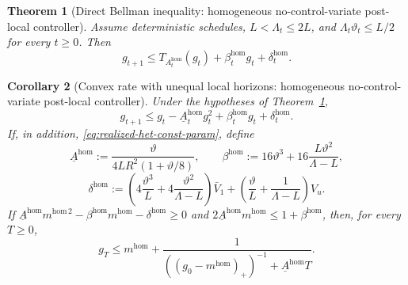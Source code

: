 \documentclass{article}
\newtheorem{theorem}{Theorem}[section]
\newtheorem{corollary}[theorem]{Corollary}
\theoremstyle{definition}
\begin{document}
\begin{theorem}[Direct Bellman inequality: homogeneous no-control-variate post-local controller]
\label{th:realized-hom-bellman}
Assume deterministic schedules, $L<\Lambda_t\le 2L$, and $\Lambda_t\vartheta_t\le L/2$ for every $t\ge 0$. Then
\begin{equation}
g_{t+1}
\le
T_{A_t^{\mathrm{hom}}}(g_t)
+
\beta_t^{\mathrm{hom}}g_t
+
\delta_t^{\mathrm{hom}}.
\label{eq:realized-hom-bellman}\end{equation}
\end{theorem}

\begin{corollary}[Convex rate with unequal local horizons: homogeneous no-control-variate post-local controller]
\label{cor:realized-hom-rate}
Under the hypotheses of Theorem~\ref{th:realized-hom-bellman},
\begin{equation}
g_{t+1}
\le
g_t-\underline A_t^{\mathrm{hom}}g_t^2+\beta_t^{\mathrm{hom}}g_t+\delta_t^{\mathrm{hom}}.
\label{eq:realized-hom-quadratic-linear}\end{equation}
If, in addition, \eqref{eq:realized-het-const-param},
define
\[
\textstyle\underline A^{\mathrm{hom}}
:=
\frac{\vartheta}{4LR^2(1+\vartheta/8)},
\qquad
\beta^{\mathrm{hom}}
:=
16\vartheta^3+16\frac{L\vartheta^2}{\Lambda-L},
\]
\[
\delta^{\mathrm{hom}}
:=
\left(
4\frac{\vartheta^3}{L}
+
4\frac{\vartheta^2}{\Lambda-L}
\right)\bar V_1
+
\left(
\frac{\vartheta}{L}
+
\frac{1}{\Lambda-L}
\right)V_u.
\]
If $\underline A^{\mathrm{hom}}m^{\mathrm{hom}\,2}
-
\beta^{\mathrm{hom}}m^{\mathrm{hom}}
-
\delta^{\mathrm{hom}}
\ge 0$ and $2\underline A^{\mathrm{hom}}m^{\mathrm{hom}}\le 1+\beta^{\mathrm{hom}}$,
then, for every $T\ge 0$,
\begin{equation}
g_T
\le
m^{\mathrm{hom}}
+
\frac{1}{((g_0-m^{\mathrm{hom}})_+)^{-1}+\underline A^{\mathrm{hom}}T}.
\label{eq:realized-hom-rate}\end{equation}
\end{corollary}
\end{document}
